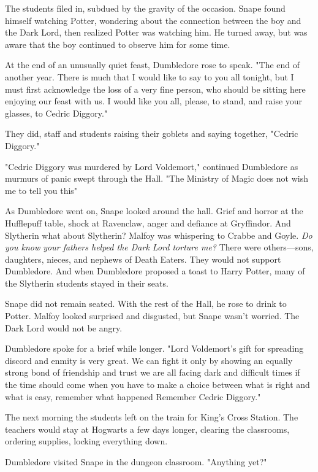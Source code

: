 The students filed in, subdued by the gravity of the occasion. Snape found himself watching Potter, wondering about the connection between the boy and the Dark Lord, then realized Potter was watching him. He turned away, but was aware that the boy continued to observe him for some time.

At the end of an unusually quiet feast, Dumbledore rose to speak. "The end of another year. There is much that I would like to say to you all tonight, but I must first acknowledge the loss of a very fine person, who should be sitting here enjoying our feast with us. I would like you all, please, to stand, and raise your glasses, to Cedric Diggory."

They did, staff and students raising their goblets and saying together, "Cedric Diggory."

"Cedric Diggory was murdered by Lord Voldemort," continued Dumbledore as murmurs of panic swept through the Hall. "The Ministry of Magic does not wish me to tell you this{\el}"

As Dumbledore went on, Snape looked around the hall. Grief and horror at the Hufflepuff table, shock at Ravenclaw, anger and defiance at Gryffindor. And Slytherin{\el} what about Slytherin? Malfoy was whispering to Crabbe and Goyle. \emph{Do you know your fathers helped the Dark Lord torture me?} There were others—sons, daughters, nieces, and nephews of Death Eaters. They would not support Dumbledore. And when Dumbledore proposed a toast to Harry Potter, many of the Slytherin students stayed in their seats.

Snape did not remain seated. With the rest of the Hall, he rose to drink to Potter. Malfoy looked surprised and disgusted, but Snape wasn't worried. The Dark Lord would not be angry.

Dumbledore spoke for a brief while longer. "{\el}Lord Voldemort's gift for spreading discord and enmity is very great. We can fight it only by showing an equally strong bond of friendship and trust{\el} we are all facing dark and difficult times{\el} if the time should come when you have to make a choice between what is right and what is easy, remember what happened{\el} Remember Cedric Diggory."

The next morning the students left on the train for King's Cross Station. The teachers would stay at Hogwarts a few days longer, clearing the classrooms, ordering supplies, locking everything down.

Dumbledore visited Snape in the dungeon classroom. "Anything yet?"

